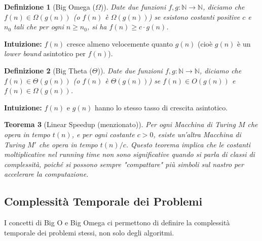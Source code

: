 \documentclass[a4paper, 11pt]{book} %
\newtheorem{theorem}{Teorema}[section]
\newtheorem{definition}[theorem]{Definizione}
\theoremstyle{definition}
\begin{document}
\begin{definition}[Big Omega ($\Omega$)]
Date due funzioni $f, g: \mathbb{N} \to \mathbb{N}$, diciamo che $f(n) \in \Omega(g(n))$ (o $f(n)$ è $\Omega(g(n))$) se esistono costanti positive $c$ e $n_0$ tali che per ogni $n \ge n_0$, si ha $f(n) \ge c \cdot g(n)$.
\end{definition}
\textbf{Intuizione:} $f(n)$ cresce almeno velocemente quanto $g(n)$ (cioè $g(n)$ è un \emph{lower bound} asintotico per $f(n)$).

\begin{center}
\end{center}

\begin{definition}[Big Theta ($\Theta$)]
Date due funzioni $f, g: \mathbb{N} \to \mathbb{N}$, diciamo che $f(n) \in \Theta(g(n))$ (o $f(n)$ è $\Theta(g(n))$) se $f(n) \in O(g(n))$ e $f(n) \in \Omega(g(n))$.
\end{definition}
\textbf{Intuizione:} $f(n)$ e $g(n)$ hanno lo stesso tasso di crescita asintotico.

\begin{theorem}[Linear Speedup (menzionato)]
Per ogni Macchina di Turing $M$ che opera in tempo $t(n)$, e per ogni costante $c > 0$, esiste un'altra Macchina di Turing $M'$ che opera in tempo $t(n)/c$.
Questo teorema implica che le costanti moltiplicative nel running time non sono significative quando si parla di classi di complessità, poiché si possono sempre "compattare" più simboli sul nastro per accelerare la computazione.
\end{theorem}

\subsection{Complessità Temporale dei Problemi}
I concetti di Big O e Big Omega ci permettono di definire la complessità temporale dei problemi stessi, non solo degli algoritmi.
\end{document}
